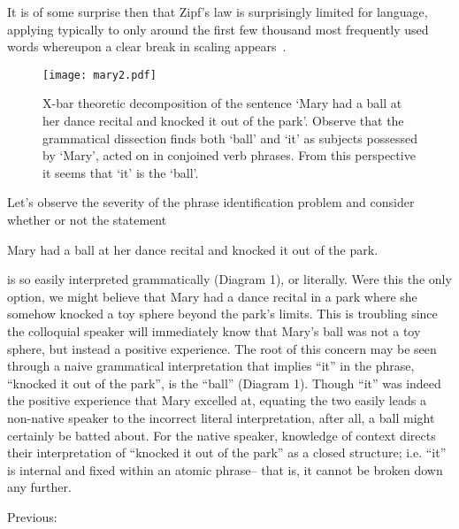 It is of some surprise then that Zipf's law is surprisingly limited
for language, applying typically to only around the first few thousand
most frequently used words whereupon a clear break in scaling
appears~\cite{bentknee,ferrericancho,ha2009a}.


\begin{figure}[tbp!]
  \centering
  \texttt{[image: mary2.pdf]}
  \caption{
    X-bar theoretic decomposition of the sentence `Mary had a ball at
    her dance recital and knocked it out of the park'. Observe that
    the grammatical dissection finds both `ball' and `it' as subjects
    possessed by `Mary', acted on in conjoined verb phrases. From this
    perspective it seems that `it' is the `ball'.
  }
  \label{fig:textpart.mary}
\end{figure}


Let's observe the severity of the phrase identification problem and consider whether or not the statement
\begin{center}
\begin{minipage}{.9\linewidth}
\center
Mary had a ball at her dance recital and knocked it out of the park.
\end{minipage}
\end{center}
\noindent is so easily interpreted grammatically (Diagram 1), or
literally.  Were this the only option, we might believe that Mary had
a dance recital in a park where she somehow knocked a toy sphere
beyond the park's limits. This is troubling since the colloquial
speaker will immediately know that Mary's ball was not a toy sphere,
but instead a positive experience. The root of this concern may be
seen through a naive grammatical interpretation that implies ``it'' in
the phrase, ``knocked it out of the park'', is the ``ball'' (Diagram
1). Though ``it'' was indeed the positive experience that Mary
excelled at, equating the two easily leads a non-native speaker to the
incorrect literal interpretation, after all, a ball might certainly be
batted about. For the native speaker, knowledge of context directs
their interpretation of ``knocked it out of the park'' as a closed
structure; i.e. ``it'' is internal and fixed within an atomic phrase--
that is, it cannot be broken down any further.


\clearpage

Previous:

